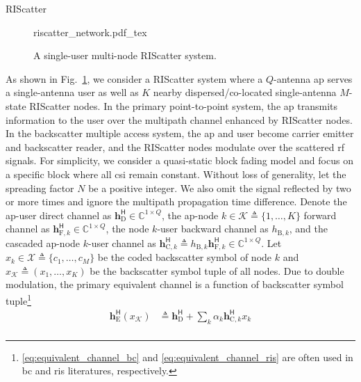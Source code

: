 \documentclass[journal,12pt,onecolumn,draftclsnofoot]{IEEEtran}
\theoremstyle{remark}
\begin{document}
\begin{section}{RIScatter}
	\begin{figure}[!t]
		\centering
		\def\svgwidth{0.4\columnwidth}
		\footnotesize{
			{riscatter_network.pdf_tex}
		}
		\caption{A single-user multi-node RIScatter system.}
		\label{fg:riscatter_network}
	\end{figure}
	As shown in Fig.~\ref{fg:riscatter_network}, we consider a RIScatter system where a $Q$-antenna \gls{ap} serves a single-antenna user as well as $K$ nearby dispersed/co-located single-antenna $M$-state RIScatter nodes.
	In the primary point-to-point system, the \gls{ap} transmits information to the user over the multipath channel enhanced by RIScatter nodes.
	In the backscatter multiple access system, the \gls{ap} and user become carrier emitter and backscatter reader, and the RIScatter nodes modulate over the scattered \gls{rf} signals.
	For simplicity, we consider a quasi-static block fading model and focus on a specific block where all \gls{csi} remain constant.
	Without loss of generality, let the spreading factor $N$ be a positive integer.
	We also omit the signal reflected by two or more times and ignore the multipath propagation time difference.
	Denote the \gls{ap}-user direct channel as $\boldsymbol{h}_{\text{D}}^\mathsf{H} \in \mathbb{C}^{1 \times Q}$, the \gls{ap}-node $k \in \mathcal{K} \triangleq \{1,\ldots,K\}$ forward channel as $\boldsymbol{h}_{\text{F},k}^\mathsf{H} \in \mathbb{C}^{1 \times Q}$, the node $k$-user backward channel as $h_{\text{B},k}$, and the cascaded \gls{ap}-node $k$-user channel as $\boldsymbol{h}_{\text{C},k}^\mathsf{H} \triangleq h_{\text{B},k} \boldsymbol{h}_{\text{F},k}^\mathsf{H} \in \mathbb{C}^{1 \times Q}$.
	Let $x_k \in \mathcal{X} \triangleq \{c_1,\ldots,c_M\}$ be the coded backscatter symbol of node $k$ and $x_{\mathcal{K}} \triangleq (x_1,\ldots,x_K)$ be the backscatter symbol tuple of all nodes.
	Due to double modulation, the primary equivalent channel is a function of backscatter symbol tuple\footnote{\eqref{eq:equivalent_channel_bc} and \eqref{eq:equivalent_channel_ris} are often used in \gls{bc} and \gls{ris} literatures, respectively.}
	\begin{subequations}
		\label{eq:equivalent_channel}
		\begin{align}
			\boldsymbol{h}_{\text{E}}^\mathsf{H}(x_{\mathcal{K}})
			 & \triangleq \boldsymbol{h}_{\text{D}}^\mathsf{H} + \sum_{k} \alpha_k \boldsymbol{h}_{\text{C},k}^\mathsf{H} x_k \label{eq:equivalent_channel_bc}                    \\

\end{align}
\end{subequations}
\end{section}
\end{document}
